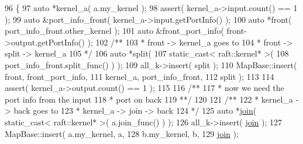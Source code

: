 \begin{DoxyCode}
96                            \{
97                               \textcolor{keyword}{auto} *kernel\_a( a.my\_kernel );
98                               assert( kernel\_a->input.count() == 1 );
99                               \textcolor{keyword}{auto} &port\_info\_front( kernel\_a->input.getPortInfo() );
100                               \textcolor{keyword}{auto} *front( port\_info\_front.other\_kernel );
101                               \textcolor{keyword}{auto} &front\_port\_info( front->output.getPortInfo() );\textcolor{comment}{}
102 \textcolor{comment}{                              /**}
103 \textcolor{comment}{                               * front -> kernel\_a goes to}
104 \textcolor{comment}{                               * front -> split -> kernel\_a}
105 \textcolor{comment}{                               */}
106                               \textcolor{keyword}{auto} *split(
107                                  static\_cast< raft::kernel* >(
108                                     port\_info\_front.split\_func() ) );
109                               all\_k->insert( split );
110                               MapBase::insert( front,    front\_port\_info,
111                                                kernel\_a, port\_info\_front,
112                                                split );
113 
114                               assert( kernel\_a->output.count() == 1 );
115 \textcolor{comment}{}
116 \textcolor{comment}{                              /**}
117 \textcolor{comment}{                               * now we need the port info from the input}
118 \textcolor{comment}{                               * port on back}
119 \textcolor{comment}{                               **/}
120 \textcolor{comment}{}
121 \textcolor{comment}{                              /**}
122 \textcolor{comment}{                               * kernel\_a -> back goes to}
123 \textcolor{comment}{                               * kernel\_a -> join -> back}
124 \textcolor{comment}{                               */}
125                               \textcolor{keyword}{auto} *\hyperlink{class_map_base_a2624d7b81f0078dcc78e524045403e28}{join}( static\_cast< raft::kernel* >( a.join\_func() ) );
126                               all\_k->insert( \hyperlink{class_map_base_a2624d7b81f0078dcc78e524045403e28}{join} );
127                               MapBase::insert( a.my\_kernel, a,
128                                                b.my\_kernel, b,
129                                                \hyperlink{class_map_base_a2624d7b81f0078dcc78e524045403e28}{join} );\textcolor{comment}{}

\end{DoxyCode}
